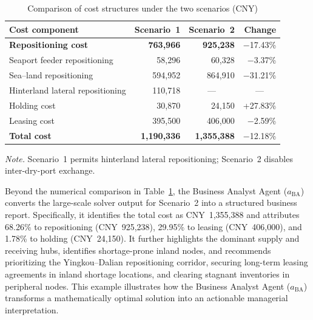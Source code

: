 \documentclass[preprint,12pt]{elsarticle}
\begin{document}
\begin{table}[htbp]
\centering
\begin{threeparttable}
\caption{Comparison of cost structures under the two scenarios (CNY)}
\label{tab:cost_summary}
\small
\setlength{\tabcolsep}{7pt}
\renewcommand{\arraystretch}{1.20}
\begin{tabular}{@{}l r r r@{}}
\toprule
\textbf{Cost component} & \textbf{Scenario~1} & \textbf{Scenario~2} & \textbf{Change} \\
\midrule
\textbf{Repositioning cost} & \textbf{763,966} & \textbf{925,238} & $-$17.43\% \\
\quad Seaport feeder repositioning & 58,296 & 60,328 & $-$3.37\% \\
\quad Sea--land repositioning & 594,952 & 864,910 & $-$31.21\% \\
\quad Hinterland lateral repositioning & 110,718 & \multicolumn{1}{c}{---} & \multicolumn{1}{c}{---} \\
\addlinespace
Holding cost & 30,870 & 24,150 & +27.83\% \\
\addlinespace
Leasing cost & 395,500 & 406,000 & $-$2.59\% \\
\midrule
\textbf{Total cost} & \textbf{1,190,336} & \textbf{1,355,388} & $-$12.18\% \\
\bottomrule
\end{tabular}
\begin{tablenotes}[flushleft]
 \footnotesize
 \item \textit{Note.} Scenario~1 permits hinterland lateral repositioning; Scenario~2 disables inter-dry-port exchange.
\end{tablenotes}
\end{threeparttable}
\end{table}

Beyond the numerical comparison in Table~\ref{tab:cost_summary}, the Business Analyst Agent ($a_{\text{BA}}$) converts the large-scale solver output for Scenario~2 into a structured business report. Specifically, it identifies the total cost as CNY~1,355,388 and attributes 68.26\% to repositioning (CNY~925,238), 29.95\% to leasing (CNY~406,000), and 1.78\% to holding (CNY~24,150). It further highlights the dominant supply and receiving hubs, identifies shortage-prone inland nodes, and recommends prioritizing the Yingkou--Dalian repositioning corridor, securing long-term leasing agreements in inland shortage locations, and clearing stagnant inventories in peripheral nodes. This example illustrates how the Business Analyst Agent ($a_{\text{BA}}$) transforms a mathematically optimal solution into an actionable managerial interpretation.
\end{document}
